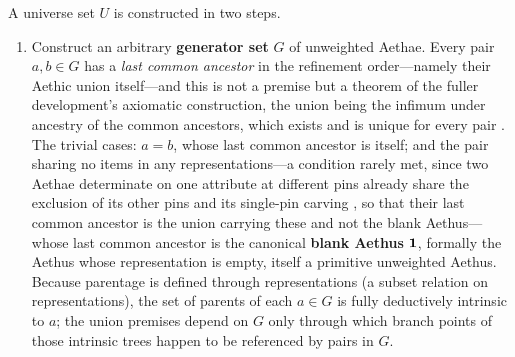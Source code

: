 \begin{defin}\label{def:universe}
A universe set $U$ is constructed in two steps.
\begin{enumerate}
\item Construct an arbitrary \textbf{generator set} $G$ of unweighted Aethae. Every pair $a, b \in G$ has a \emph{last common ancestor} in the refinement order---namely their Aethic union itself---and this is not a premise but a theorem of the fuller development's axiomatic construction, the union being the infimum under ancestry of the common ancestors, which exists and is unique for every pair \cite{Aethus}. The trivial cases: $a = b$, whose last common ancestor is itself; and the pair sharing no items in any representations---a condition rarely met, since two Aethae determinate on one attribute at different pins already share the exclusion of its other pins and its single-pin carving \cite{Aethus}, so that their last common ancestor is the union carrying these and not the blank Aethus---whose last common ancestor is the canonical \textbf{blank Aethus} $\mathbf{1}$, formally the Aethus whose representation is empty, itself a primitive unweighted Aethus. Because parentage is defined through representations (a subset relation on representations), the set of parents of each $a \in G$ is fully deductively intrinsic to $a$; the union premises depend on $G$ only through which branch points of those intrinsic trees happen to be referenced by pairs in $G$.

\end{enumerate}
\end{defin}
